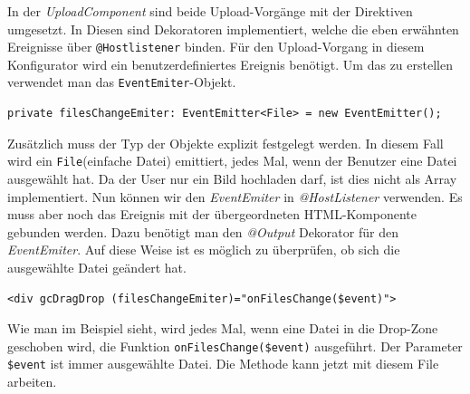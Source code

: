 In der \textit{UploadComponent} sind beide Upload-Vorgänge mit der Direktiven umgesetzt. In Diesen sind Dekoratoren implementiert, welche die eben erwähnten  Ereignisse über \texttt{@Hostlistener} binden. Für den Upload-Vorgang in diesem Konfigurator wird ein benutzerdefiniertes Ereignis benötigt. Um das zu erstellen verwendet man das \texttt{EventEmiter}-Objekt.
%
\begin{lstlisting}[caption={Umsetzung des Event-Emiter-Objekts},label=lst:eventemiter]
private filesChangeEmiter: EventEmitter<File> = new EventEmitter();
\end{lstlisting}
%
Zusätzlich muss der Typ der Objekte explizit festgelegt werden. In diesem Fall wird ein \texttt{File}(einfache Datei) emittiert, jedes Mal, wenn der Benutzer eine Datei ausgewählt hat. Da der User nur ein Bild hochladen darf, ist dies nicht als Array implementiert. Nun können wir den \textit{EventEmiter} in \textit{@HostListener} verwenden. Es muss aber noch das Ereignis mit der übergeordneten HTML-Komponente gebunden werden. Dazu benötigt man den \textit{@Output} Dekorator für den \textit{EventEmiter}. Auf diese Weise ist es möglich zu überprüfen, ob sich die ausgewählte Datei geändert hat.
%
\begin{lstlisting}[caption={Drop-Zone Element mit der EventEmiter-Funktion},label=lst:dropzone]
<div gcDragDrop (filesChangeEmiter)="onFilesChange($event)">
\end{lstlisting}
%
Wie man im Beispiel sieht, wird jedes Mal, wenn eine Datei in die Drop-Zone geschoben wird, die Funktion \texttt{onFilesChange(\$event)} ausgeführt. Der Parameter \texttt{\$event} ist immer ausgewählte Datei. Die Methode kann jetzt mit diesem File arbeiten.\\


